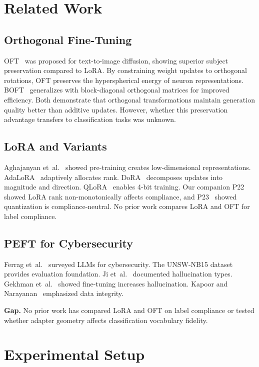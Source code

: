\documentclass[review,3p]{elsarticle}
\begin{document}
\section{Related Work}

\subsection{Orthogonal Fine-Tuning}
OFT~\cite{qiu2023} was proposed for text-to-image diffusion, showing superior subject preservation compared to LoRA. By constraining weight updates to orthogonal rotations, OFT preserves the hyperspherical energy of neuron representations. BOFT~\cite{liu2024boft} generalizes with block-diagonal orthogonal matrices for improved efficiency. Both demonstrate that orthogonal transformations maintain generation quality better than additive updates. However, whether this preservation advantage transfers to classification tasks was unknown.

\subsection{LoRA and Variants}
Aghajanyan et~al.~\cite{aghajanyan2021} showed pre-training creates low-dimensional representations. AdaLoRA~\cite{zhang2023} adaptively allocates rank. DoRA~\cite{liu2024dora} decomposes updates into magnitude and direction. QLoRA~\cite{dettmers2023} enables 4-bit training. Our companion P22~\cite{p22} showed LoRA rank non-monotonically affects compliance, and P23~\cite{p23} showed quantization is compliance-neutral. No prior work compares LoRA and OFT for label compliance.

\subsection{PEFT for Cybersecurity}
Ferrag et~al.~\cite{ferrag2024} surveyed LLMs for cybersecurity. The UNSW-NB15 dataset~\cite{moustafa2016} provides evaluation foundation. Ji et~al.~\cite{ji2023} documented hallucination types. Gekhman et~al.~\cite{gekhman2024} showed fine-tuning increases hallucination. Kapoor and Narayanan~\cite{kapoor2023} emphasized data integrity.

\textbf{Gap.} No prior work has compared LoRA and OFT on label compliance or tested whether adapter geometry affects classification vocabulary fidelity.

\section{Experimental Setup}
\end{document}
